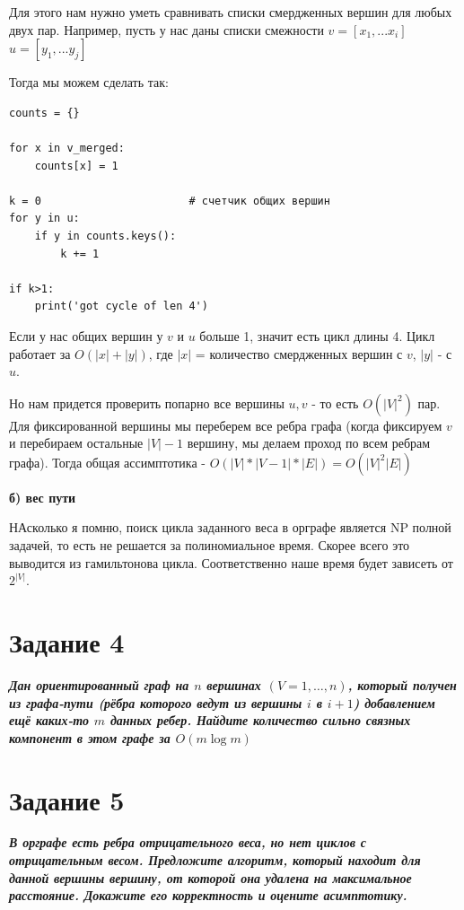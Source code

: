 \documentclass{article}
\begin{document}
Для этого нам нужно уметь сравнивать списки смердженных вершин для любых двух пар. Например, пусть у нас даны списки смежности 
$v = [x_1, ... x_i]$
$u = [y_1, ... y_j]$

Тогда мы можем сделать так:

\begin{verbatim}
counts = {}

for x in v_merged:
    counts[x] = 1

k = 0                       # счетчик общих вершин
for y in u:
    if y in counts.keys():
        k += 1

if k>1:
    print('got cycle of len 4')
\end{verbatim}

Если у нас общих вершин у $v$ и $u$ больше 1, значит есть цикл длины 4. 
Цикл работает за $O(|x| + |y|)$, где $|x|$ = количество смердженных вершин с $v$, $|y|$ - с $u$. 

Но нам придется проверить попарно все вершины $u, v$ - то есть $O(|V|^2)$ пар. Для фиксированной вершины мы переберем все ребра графа (когда фиксируем $v$ и перебираем остальные $|V| - 1$ вершину, мы делаем проход по всем ребрам графа). Тогда общая ассимптотика - $O(|V| * |V-1|*|E|) = O(|V|^2|E|)$



\textbf{б) вес пути}

НАсколько я помню, поиск цикла заданного веса в орграфе является NP полной задачей, то есть не решается за полиномиальное время. Скорее всего это выводится из гамильтонова цикла. Соответственно наше время будет зависеть от $2^{|V|}$. 
\bigskip

\section*{\textbf{Задание 4}} \textbf{\textit{Дан ориентированный граф на $n$ вершинах $(V = {1, \dots,n})$, который получен из графа-пути (рёбра которого ведут из вершины $i$ в $i + 1$) добавлением ещё каких-то $m$ данных ребер. Найдите количество сильно связных компонент в этом графе за $O(m \log m)$}}


\bigskip

\section*{\textbf{Задание 5}} \textbf{\textit{В орграфе есть ребра отрицательного веса, но нет циклов с отрицательным весом. Предложите алгоритм, который находит для данной вершины вершину, \textbf{от которой} она удалена на максимальное расстояние. Докажите его корректность и оцените асимптотику.}}
\end{document}
